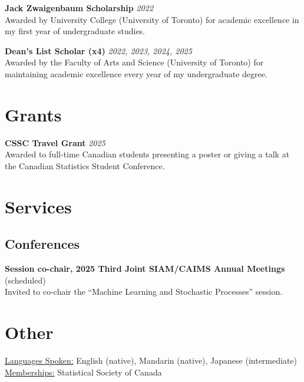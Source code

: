 \documentclass[11pt]{article}
\theoremstyle{definition}
\newcommand{\1}{\mathds 1}
\begin{document}
\textbf{Jack Zwaigenbaum Scholarship }\hfill \textit{2022}\\
Awarded by University College (University of Toronto) for academic excellence in my first year of undergraduate studies.

\textbf{Dean's List Scholar (x4)} \hfill \textit{2022, 2023, 2024, 2025}\\
Awarded by the Faculty of Arts and Science (University of Toronto) for maintaining academic excellence every year of my undergraduate degree. 

\section*{Grants}
\textbf{CSSC Travel Grant} \hfill \textit{2025}\\
Awarded to full-time Canadian students presenting a poster or giving a talk at the Canadian Statistics Student Conference.

\section*{Services}
\subsection*{Conferences}
\textbf{Session co-chair, 2025 Third Joint SIAM/CAIMS Annual Meetings} (scheduled) \\
Invited to co-chair the ``Machine Learning and Stochastic Processes'' session.


\section*{Other}
\underline{Languages Spoken:} English (native), Mandarin (native), Japanese (intermediate)\\
\underline{Memberships:} Statistical Society of Canada
\end{document}
